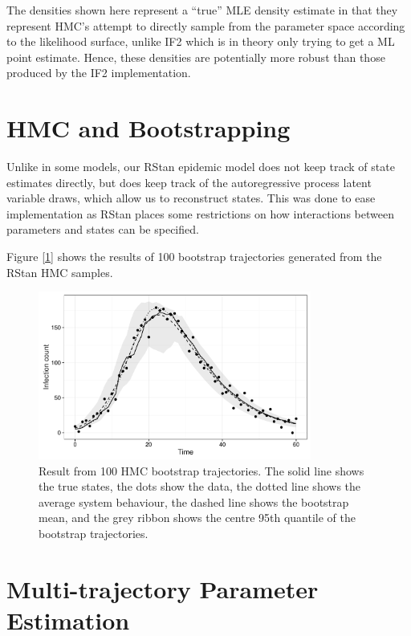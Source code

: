     The densities shown here represent a ``true'' MLE density estimate in that they represent HMC's attempt to directly sample from the parameter space according to the likelihood surface, unlike IF2 which is in theory only trying to get a ML point estimate. Hence, these densities are potentially more robust than those produced by the IF2 implementation.


\section{HMC and Bootstrapping}

	Unlike in some models, our RStan epidemic model does not keep track of state estimates directly, but does keep track of the autoregressive process latent variable draws, which allow us to reconstruct states. This was done to ease implementation as RStan places some restrictions on how interactions between parameters and states can be specified.

	Figure [\ref{hmcboot}] shows the results of 100 bootstrap trajectories generated from the RStan HMC samples.

	\begin{figure}
        \centering
        \captionsetup{width=.8\linewidth}
        \includegraphics[width=0.8\textwidth]{./images/hmcboot.pdf}
        \caption{Result from 100 HMC bootstrap trajectories. The solid line shows the true states, the dots show the data, the dotted line shows the average system behaviour, the dashed line shows the bootstrap mean, and the grey ribbon shows the centre 95th quantile of the bootstrap trajectories. \label{hmcboot}}
    \end{figure}


\section{Multi-trajectory Parameter Estimation}

